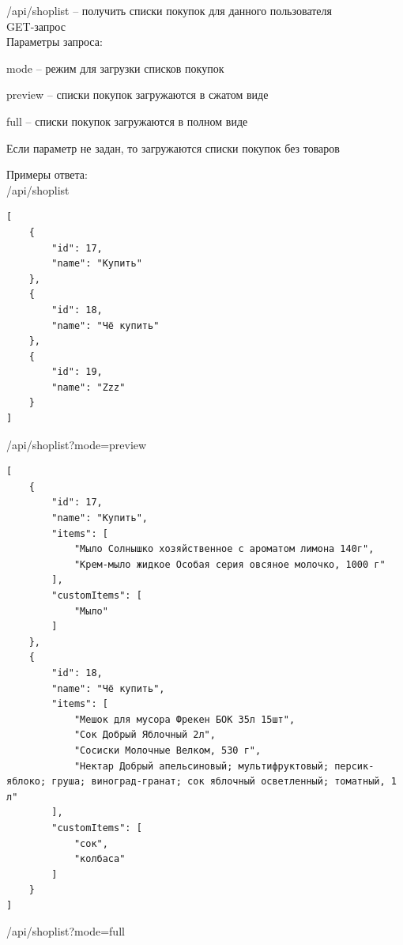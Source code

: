 \noindent
/api/shoplist -- получить списки покупок для данного пользователя\\
GET-запрос\\
Параметры запроса:
\begin{my_enumerate}
  \item mode -- режим для загрузки списков покупок
    \begin{my_enumerate}
      \item preview -- списки покупок загружаются в сжатом виде
      \item full -- списки покупок загружаются в полном виде
    \end{my_enumerate}
    Если параметр не задан, то загружаются списки покупок без товаров
\end{my_enumerate}
Примеры ответа:\\
/api/shoplist
\begin{verbatim}
[
    {
        "id": 17,
        "name": "Купить"
    },
    {
        "id": 18,
        "name": "Чё купить"
    },
    {
        "id": 19,
        "name": "Zzz"
    }
]
\end{verbatim}
/api/shoplist?mode=preview
\begin{verbatim}
[
    {
        "id": 17,
        "name": "Купить",
        "items": [
            "Мыло Солнышко хозяйственное с ароматом лимона 140г",
            "Крем-мыло жидкое Особая серия овсяное молочко, 1000 г"
        ],
        "customItems": [
            "Мыло"
        ]
    },
    {
        "id": 18,
        "name": "Чё купить",
        "items": [
            "Мешок для мусора Фрекен БОК 35л 15шт",
            "Сок Добрый Яблочный 2л",
            "Сосиски Молочные Велком, 530 г",
            "Нектар Добрый апельсиновый; мультифруктовый; персик-яблоко; груша; виноград-гранат; сок яблочный осветленный; томатный, 1 л"
        ],
        "customItems": [
            "сок",
            "колбаса"
        ]
    }
]
\end{verbatim}
/api/shoplist?mode=full
